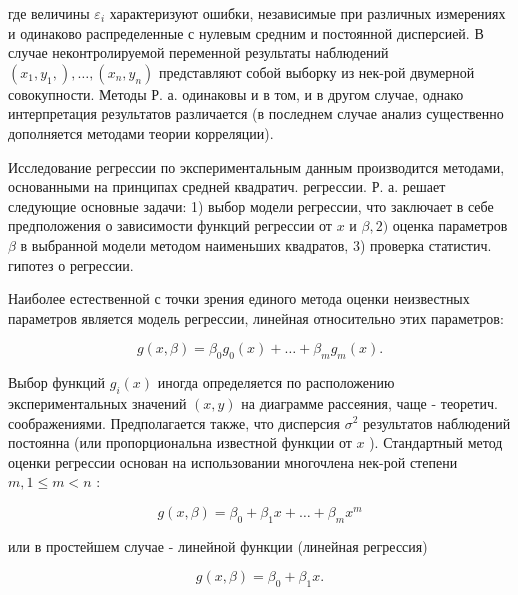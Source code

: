 \documentclass[10pt]{article}
\begin{document}
где величины $\varepsilon_{i}$ характеризуют ошибки, независимые при различных измерениях и одинаково распределенные с нулевым средним и постоянной дисперсией. В случае неконтролируемой переменной результаты наблюдений $\left(x_{1}, y_{1},\right), \ldots,\left(x_{n}, y_{n}\right)$ представляют собой выборку из нек-рой двумерной совокупности. Методы Р. а. одинаковы и в том, и в другом случае, однако интерпретация результатов различается (в последнем случае анализ существенно дополняется методами теории корреляции).



Исследование регрессии по экспериментальным данным производится методами, основанными на принципах средней квадратич. регрессии. Р. а. решает следующие основные задачи: 1) выбор модели регрессии, что заключает в себе предположения о зависимости функций регрессии от $x$ и $\beta, 2)$ оценка параметров $\beta$ в выбранной модели методом наименьших квадратов, 3) проверка статистич. гипотез о регрессии.



Наиболее естественной с точки зрения единого метода оценки неизвестных параметров является модель регрессии, линейная относительно этих параметров:



\[

g(x, \beta)=\beta_{0} g_{0}(x)+\ldots+\beta_{m} g_{m}(x) .

\]



Выбор функций $g_{i}(x)$ иногда определяется по расположению экспериментальных значений $(x, y)$ на диаграмме рассеяния, чаще - теоретич. соображениями. Предполагается также, что дисперсия $\sigma^{2}$ результатов наблюдений постоянна (или пропорциональна известной функции от $x$ ). Стандартный метод оценки регрессии основан на использовании многочлена нек-рой степени $m, 1 \leqslant m<n$ :



\[

g(x, \beta)=\beta_{0}+\beta_{1} x+\ldots+\beta_{m} x^{m}

\]



или в простейшем случае - линейной функции (линейная регрессия)



\[

g(x, \beta)=\beta_{0}+\beta_{1} x .

\]
\end{document}
